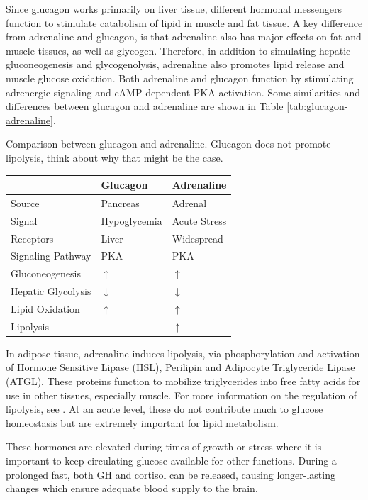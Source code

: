\documentclass{tufte-handout}
\begin{document}
Since glucagon works primarily on liver tissue, different hormonal messengers function to stimulate catabolism of lipid in muscle and fat tissue.  A key difference from adrenaline and glucagon, is that adrenaline also has major effects on fat and muscle tissues, as well as glycogen.  Therefore, in addition to simulating hepatic gluconeogenesis and glycogenolysis, adrenaline also promotes lipid release and muscle glucose oxidation.  Both adrenaline and glucagon function by stimulating adrenergic signaling and cAMP-dependent PKA activation.  Some similarities and differences between glucagon and adrenaline are shown in Table \ref{tab:glucagon-adrenaline}.

\begin{margintable}
\caption{Comparison between glucagon and adrenaline.  Glucagon does not promote lipolysis, think about why that might be the case.}
\label{tab:glucagon-adrenaline}
\begin{tabular}{@{}lll@{}}
 & \textbf{Glucagon}  & \textbf{Adrenaline}           \\ \midrule
Source & Pancreas & Adrenal \\ 
Signal & Hypoglycemia & Acute Stress \\ 
Receptors & Liver & Widespread \\ 
Signaling Pathway & PKA & PKA \\  
Gluconeogenesis & $\uparrow$ & $\uparrow$ \\  
Hepatic Glycolysis & $\downarrow$ & $\downarrow$ \\ 
Lipid Oxidation & $\uparrow$ & $\uparrow$ \\ 
Lipolysis & - & $\uparrow$\\ \bottomrule
\end{tabular}
\end{margintable}

In adipose tissue, adrenaline induces lipolysis, via phosphorylation and activation of Hormone Sensitive Lipase (HSL), Perilipin and Adipocyte Triglyceride Lipase (ATGL).  These proteins function to mobilize triglycerides into free fatty acids for use in other tissues, especially muscle.  For more information on the regulation of lipolysis, see \citep{Young2013}.  At an acute level, these do not contribute much to glucose homeostasis but are extremely important for lipid metabolism.

  These hormones are elevated during times of growth or stress where it is important to keep circulating glucose available for other functions.  During a prolonged fast, both GH and cortisol can be released, causing longer-lasting changes which ensure adequate blood supply to the brain.
\end{document}

